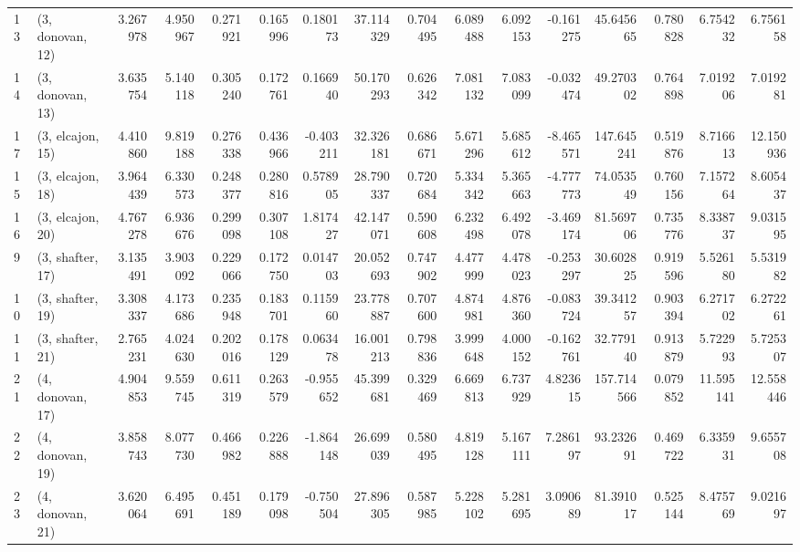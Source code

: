\begin{tabular}{llrrrrrrrrrrrrrr}
13 &  (3, donovan, 12) &  3.267978 &   4.950967 &   0.271921 &  0.165996 &  0.180173 &   37.114329 &  0.704495 &   6.089488 &   6.092153 & -0.161275 &   45.645665 &  0.780828 &   6.754232 &   6.756158 \\
14 &  (3, donovan, 13) &  3.635754 &   5.140118 &   0.305240 &  0.172761 &  0.166940 &   50.170293 &  0.626342 &   7.081132 &   7.083099 & -0.032474 &   49.270302 &  0.764898 &   7.019206 &   7.019281 \\
17 &  (3, elcajon, 15) &  4.410860 &   9.819188 &   0.276338 &  0.436966 & -0.403211 &   32.326181 &  0.686671 &   5.671296 &   5.685612 & -8.465571 &  147.645241 &  0.519876 &   8.716613 &  12.150936 \\
15 &  (3, elcajon, 18) &  3.964439 &   6.330573 &   0.248377 &  0.280816 &  0.578905 &   28.790337 &  0.720684 &   5.334342 &   5.365663 & -4.777773 &   74.053549 &  0.760156 &   7.157264 &   8.605437 \\
16 &  (3, elcajon, 20) &  4.767278 &   6.936676 &   0.299098 &  0.307108 &  1.817427 &   42.147071 &  0.590608 &   6.232498 &   6.492078 & -3.469174 &   81.569706 &  0.735776 &   8.338737 &   9.031595 \\
9  &  (3, shafter, 17) &  3.135491 &   3.903092 &   0.229066 &  0.172750 &  0.014703 &   20.052693 &  0.747902 &   4.477999 &   4.478023 & -0.253297 &   30.602825 &  0.919596 &   5.526180 &   5.531982 \\
10 &  (3, shafter, 19) &  3.308337 &   4.173686 &   0.235948 &  0.183701 &  0.115960 &   23.778887 &  0.707600 &   4.874981 &   4.876360 & -0.083724 &   39.341257 &  0.903394 &   6.271702 &   6.272261 \\
11 &  (3, shafter, 21) &  2.765231 &   4.024630 &   0.202016 &  0.178129 &  0.063478 &   16.001213 &  0.798836 &   3.999648 &   4.000152 & -0.162761 &   32.779140 &  0.913879 &   5.722993 &   5.725307 \\
21 &  (4, donovan, 17) &  4.904853 &   9.559745 &   0.611319 &  0.263579 & -0.955652 &   45.399681 &  0.329469 &   6.669813 &   6.737929 &  4.823615 &  157.714566 &  0.079852 &  11.595141 &  12.558446 \\
22 &  (4, donovan, 19) &  3.858743 &   8.077730 &   0.466982 &  0.226888 & -1.864148 &   26.699039 &  0.580495 &   4.819128 &   5.167111 &  7.286197 &   93.232691 &  0.469722 &   6.335931 &   9.655708 \\
23 &  (4, donovan, 21) &  3.620064 &   6.495691 &   0.451189 &  0.179098 & -0.750504 &   27.896305 &  0.587985 &   5.228102 &   5.281695 &  3.090689 &   81.391017 &  0.525144 &   8.475769 &   9.021697 \\

\end{tabular}

